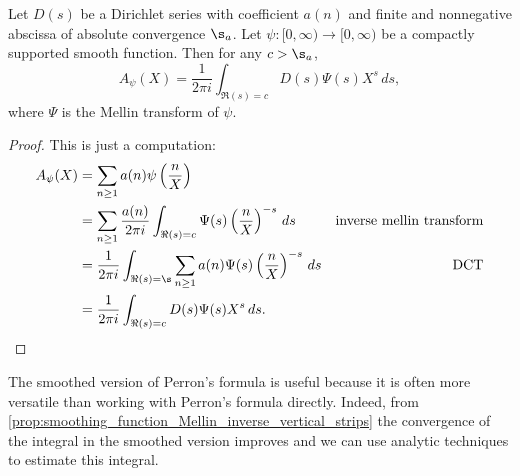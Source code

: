       \begin{theorem}
        Let $D(s)$ be a Dirichlet series with coefficient $a(n)$ and finite and nonnegative abscissa of absolute convergence $\s_{a}$. Let $\psi:[0,\infty) \to [0,\infty)$ be a compactly supported smooth function. Then for any $c > \s_{a}$,
        \[
          A_{\psi}(X) = \frac{1}{2\pi i}\int_{\Re(s) = c}D(s)\Psi(s)X^{s}\,ds,
        \]
        where $\Psi$ is the Mellin transform of $\psi$.
      \end{theorem}
      \begin{proof}
        This is just a computation:
        \begin{align*}
          A_{\psi}(X) &= \sum_{n \ge 1}a(n)\psi\left(\frac{n}{X}\right) \\
          &= \sum_{n \ge 1}\frac{a(n)}{2\pi i}\int_{\Re(s) = c}\Psi(s)\left(\frac{n}{X}\right)^{-s}\,ds & \text{inverse mellin transform} \\
          &= \frac{1}{2\pi i}\int_{\Re(s) = \s}\sum_{n \ge 1}a(n)\Psi(s)\left(\frac{n}{X}\right)^{-s}\,ds & \text{DCT} \\
          &= \frac{1}{2\pi i}\int_{\Re(s) = c}D(s)\Psi(s)X^{s}\,ds. \\
      \end{align*}
      \end{proof}

      The smoothed version of Perron's formula is useful because it is often more versatile than working with Perron's formula directly. Indeed, from \cref{prop:smoothing_function_Mellin_inverse_vertical_strips} the convergence of the integral in the smoothed version improves and we can use analytic techniques to estimate this integral.
